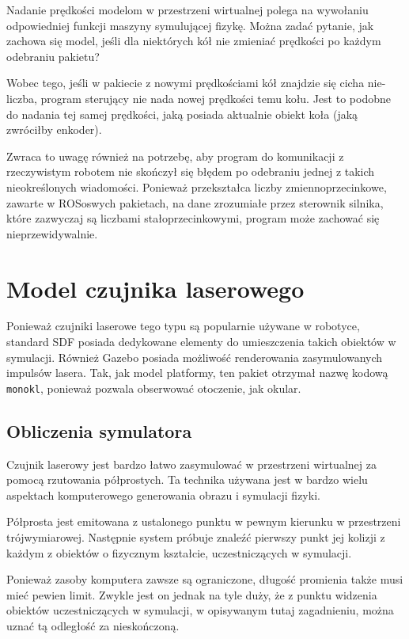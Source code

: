 		Nadanie prędkości modelom w przestrzeni wirtualnej polega na wywołaniu odpowiedniej funkcji maszyny symulującej fizykę.
		Można zadać pytanie, jak zachowa się model, jeśli dla niektórych kół nie zmieniać prędkości po każdym odebraniu pakietu?

		Wobec tego, jeśli w pakiecie z nowymi prędkościami kół znajdzie się cicha nie-liczba, program sterujący nie nada nowej prędkości temu kołu.
		Jest to podobne do nadania tej samej prędkości, jaką posiada aktualnie obiekt koła (jaką zwróciłby enkoder).

		Zwraca to uwagę również na potrzebę, aby program do komunikacji z rzeczywistym robotem nie skończył się błędem po odebraniu jednej z takich nieokreślonych wiadomości.
		Ponieważ przekształca liczby zmiennoprzecinkowe, zawarte w ROSoswych pakietach, na dane zrozumiałe przez sterownik silnika, które zazwyczaj są liczbami
		stałoprzecinkowymi, program może zachować się nieprzewidywalnie.
		
\section{Model czujnika laserowego}
	\label{sec:monokl}
	Ponieważ czujniki laserowe tego typu są popularnie używane w robotyce, standard SDF posiada dedykowane elementy do umieszczenia takich obiektów w symulacji.
	Również Gazebo posiada możliwość renderowania zasymulowanych impulsów lasera.
	Tak, jak model platformy, ten pakiet otrzymał nazwę kodową \texttt{monokl}, ponieważ pozwala obserwować otoczenie, jak okular.

	\subsection{Obliczenia symulatora}
		Czujnik laserowy jest bardzo łatwo zasymulować w przestrzeni wirtualnej za pomocą rzutowania półprostych.
		Ta technika używana jest w bardzo wielu aspektach komputerowego generowania obrazu i symulacji fizyki.

		Półprosta jest emitowana z ustalonego punktu w pewnym kierunku w przestrzeni trójwymiarowej.
		Następnie system próbuje znaleźć pierwszy punkt jej kolizji z każdym z obiektów o fizycznym kształcie, uczestniczących w symulacji.
		
		Ponieważ zasoby komputera zawsze są ograniczone, długość promienia także musi mieć pewien limit. 
		Zwykle jest on jednak na tyle duży, że z punktu widzenia obiektów uczestniczących w symulacji, w opisywanym tutaj zagadnieniu, 
		można uznać tą odległość za nieskończoną.


